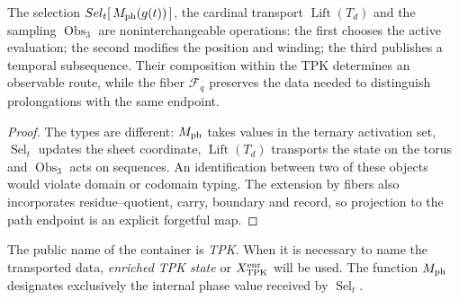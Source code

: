 \begin{proposition}
\label{prop:tpk-separacion-operadores-rev11}
The selection \(\operatorname{Sel}_t[\,M_{\rm ph}(g(t))\,]\), the cardinal
transport \(\operatorname{Lift}(T_d)\) and the sampling
\(\operatorname{Obs}_3\) are noninterchangeable operations: the first chooses
the active evaluation; the second modifies the position and winding; the
third publishes a temporal subsequence. Their composition within the TPK
determines an observable route, while the fiber \(\mathcal F_q\) preserves
the data needed to distinguish prolongations with the same endpoint.
\end{proposition}

\begin{proof}
The types are different: \(M_{\rm ph}\) takes values in the ternary activation
set, \(\operatorname{Sel}_t\) updates the sheet coordinate,
\(\operatorname{Lift}(T_d)\) transports the state on the torus and
\(\operatorname{Obs}_3\) acts on sequences. An identification between two
of these objects would violate domain or codomain typing. The extension by fibers
also incorporates residue--quotient, carry, boundary and record, so
projection to the path endpoint is an explicit forgetful map.
\end{proof}

\begin{statusbox}[title={Canonical nomenclature}]
The public name of the container is \emph{TPK}. When it is necessary to
name the transported data, \emph{enriched TPK state} or
\(\mathcal X_{\rm TPK}^{\rm enr}\) will be used. The function \(M_{\rm ph}\) designates
exclusively the internal phase value received by
\(\operatorname{Sel}_t\).
\end{statusbox}
